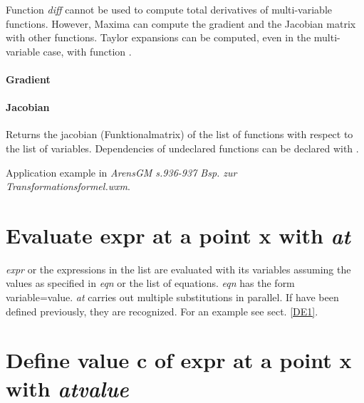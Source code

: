 \documentclass[../Maxima_Workbook.tex]{subfiles}
\begin{document}
Function \emph{diff} cannot be used to compute total derivatives of multi-variable functions. However, Maxima can compute the gradient and the Jacobian matrix with other functions. Taylor expansions can be computed, even in the multi-variable case, with function .

\paragraph{Gradient} \mbox{}

\lz 

\paragraph{Jacobian} \mbox{}

\lzz \lz {} \hfill \tcr{[function]}

\lz Returns the jacobian (Funktionalmatrix) of the list of functions with respect to the list of variables. Dependencies of undeclared functions can be declared with .

\lz Application example in \emph{ArensGM s.936-937 Bsp. zur Transformationsformel.wxm}.

\section{Evaluate expr at a point x with \emph{at}}

\lz {} \hfill \tcr{[function]}

\lz \emph{expr} or the expressions in the list are evaluated with its variables assuming the values as specified in \emph{eqn} or the list of equations. \emph{eqn} has the form variable=value. \emph{at} carries out multiple substitutions in parallel. If  have been defined previously, they are recognized. For an example see sect. \ref{DE1}.

\section{Define value c of expr at a point x with \emph{atvalue}}

\lz {} \hfill \tcr{[function]}
\end{document}
